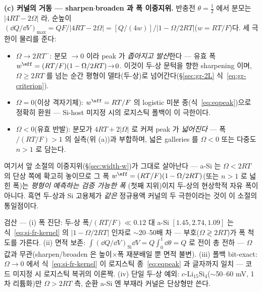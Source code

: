 \textbf{(c) 커널의 거동 --- sharpen$\cdot$broaden 과 폭 이중지위.} 반충전 $\theta=\tfrac12$ 에서 분모는
$|4RT-2\Omega|$ 라, 순높이 $(\dd Q/\dd V)_{\max}=QF/|4RT-2\Omega|=[Q/(4w)]/|1-\Omega/2RT|$($w=RT/F$)다. 세
극한이 물리를 준다:
\begin{itemize}[leftmargin=1.5em,itemsep=1pt]
\item $\Omega\!\to\!2RT^-$: 분모 $\to0$ 이라 peak 가 \emph{좁아지고 발산}한다 --- 유효 폭
$w^{\eff}=(RT/F)(1-\Omega/2RT)\!\to\!0$. 이것이 두-상 문턱을 향한 sharpening 이며, $\Omega\!\ge\!2RT$ 를 넘는 순간
평형이 델타(두-상)로 넘어간다(\S\ref{sec:gr-2L} 식~\eqref{eq:gr-criterion}).
\item $\Omega=0$(이상 격자기체): $w^{\eff}=RT/F$ 의 logistic 미분 종(식~\eqref{eq:eqpeak})으로 정확히 환원 ---
Si-host 미지정 시의 로지스틱 폴백이 이 극한이다.
\item $\Omega<0$(유효 반발): 분모가 $4RT+2|\Omega|$ 로 커져 peak 가 \emph{넓어진다} --- 폭$/(RT/F)>1$ 의 실측(위
(a))과 부합하며, 넓은 galleries 를 $\Omega<0$ 또는 다중도 $n>1$ 로 담는다.
\end{itemize}
여기서 앞 소절의 이중지위(\S\ref{sec:width-w})가 그대로 살아난다 --- a-Si 는 $\Omega<2RT$ 의 단상 쪽에 확고히
놓이므로 그 폭 $w^{\eff}=(RT/F)(1-\Omega/2RT)$(또는 $n>1$ 로 넓힌 폭)는 \emph{평형이 예측하는 검증 가능한 폭}
(첫째 지위)이지 두-상의 현상학적 자유 폭이 아니다. 흑연 두-상과 Si 고용체가 \emph{같은} 정규용액 커널의 두 극한이라는
것이 이 소절의 통일점이다.
\begin{verifybox}
검산 --- (i) 폭 진단: 두-상 폭$/(RT/F)\!\ll\!0.12$ 대 a-Si $[1.45,2.74,1.09]$ 는 식~\eqref{eq:si-fr-kernel} 의
$|1-\Omega/2RT|$ 인자로 $\sim$20--50배 차 --- 부호($\Omega\!\gtrless\!2RT$)가 폭 척도를 가른다. (ii) 면적 보존:
$\int(\dd Q/\dd V)_{\mathrm{Si}}\dd V=Q\!\int_0^1\dd\theta=Q$ 로 전이 총 전하 --- $\Omega$ 값과 무관(sharpen/broaden
은 높이$\times$폭 재분배일 뿐 면적 불변). (iii) 폴백 bit-exact: $\Omega\!\to\!0$ 에서 식~\eqref{eq:si-fr-kernel} 이
로지스틱 종~\eqref{eq:eqpeak} 과 글자까지 일치 --- 코드  미지정 시 로지스틱 복귀의 이론짝.
(iv) 단일 두-상 예외: $c$-$\mathrm{Li_{15}Si_4}$($\sim$50--60 mV, 1차 리튬화)만 $\Omega\!>\!2RT$ 측, 순환 a-Si 엔
부재라 커널은 단상형만 쓴다.
\end{verifybox}

